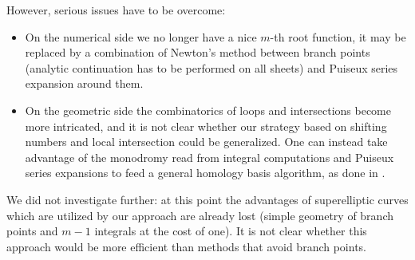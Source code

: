 \documentclass[main.tex]{subfiles}
\begin{document}
  However, serious issues have to be overcome:
  \begin{itemize}
      \item On the numerical side we no longer have a nice $m$-th root function,
          it may be replaced by a combination of Newton's method between branch
          points (analytic continuation has to
          be performed on all sheets) and
          Puiseux series expansion around them.
      \item On the geometric side the combinatorics of loops and intersections
          become more intricated, and it is not clear whether our strategy
          based on shifting numbers and local intersection could be generalized.
          One can instead take advantage of the monodromy read from
          integral computations and Puiseux series expansions to feed a general
          homology basis algorithm, as done in \cite{FrauendienerKlein2016}.
  \end{itemize}
  We did not investigate further: at this point the advantages
  of superelliptic curves which are utilized by our approach are already lost
  (simple geometry of branch points and $m-1$ integrals at the cost of one).
  It is not clear whether this approach would
  be more efficient than methods that avoid branch points.

  \biblio
  
\end{document}
